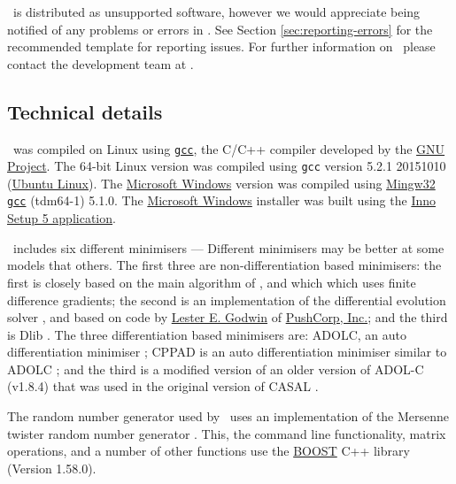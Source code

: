 \CNAME\ is distributed as unsupported software, however we would appreciate being notified of any problems or errors in \CNAME. See Section \ref{sec:reporting-errors} for the recommended template for reporting issues. For further information on \CNAME\, please contact the development team at \email.

\subsection{Technical details}\label{sec:tech}

\CNAME\ was compiled on Linux using \href{http://gcc.gnu.org}{\texttt{gcc}}, the C/C++ compiler developed by the \href{http://gcc.gnu.org}{GNU Project}. The 64-bit Linux  version was compiled using \texttt{gcc} version 5.2.1 20151010 (\href{http://www.ubuntu.com/}{Ubuntu Linux}). The \href{http://www.microsoft.com}{Microsoft Windows} version was compiled using \href{http://www.mingw.org}{Mingw32} \href{http://gcc.gnu.org}{\texttt{gcc}} (tdm64-1) 5.1.0. The \href{http://www.microsoft.com}{Microsoft Windows} installer was built using the \href{http://www.jrsoftware.org/isdl.php}{Inno Setup 5 application}.

\CNAME\ includes six different minimisers --- Different minimisers may be better at some models that others. The first three are non-differentiation based minimisers: the first is closely based on the main algorithm of \cite{779}, and which which uses finite difference gradients; the second is an implementation of the differential evolution solver \citep{1442}, and based on code by \href{mailto:<godwin@pushcorp.com>}{Lester E. Godwin} of \href{http://www.pushcorp.com}{PushCorp, Inc.}; and the third is Dlib \citep{dlib09}. The three differentiation based minimisers are: ADOLC, an auto differentiation minimiser \citep{walther1996adolc}; CPPAD is an auto differentiation minimiser similar to ADOLC \citep{wachter2006cppad}; and the third is a modified version of an older version of ADOL-C (v1.8.4) that was used in the original version of CASAL \citep{1388}.

The random number generator used by \CNAME\ uses an implementation of the Mersenne twister random number generator \citep{796}. This, the command line functionality, matrix operations, and a number of other functions use the \href{http://www.boost.org/}{BOOST} C++ library (Version 1.58.0).

